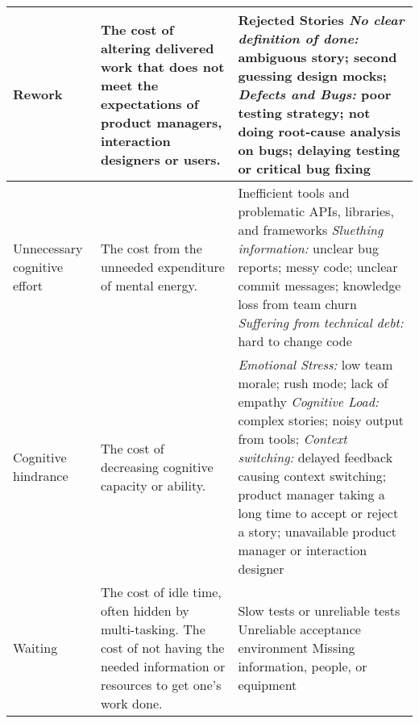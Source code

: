 \begin{table*}[t]
\begin{tabular}{|p{1.7in}|p{1.9in}|p{3in}|}
Rework                                & The cost of altering delivered work that does not meet the expectations of product managers, interaction designers or users.    & Rejected Stories \newline \textit{No clear definition of done:} ambiguous story; second guessing design mocks; \newline \textit{Defects and Bugs:} poor testing strategy; not doing root-cause analysis on bugs; delaying testing or critical bug fixing                                                                                                                                                                    \\ \hline
Unnecessary cognitive effort          &   The cost from the unneeded expenditure of mental energy.                                                                                                                 & Inefficient tools and problematic APIs, libraries, and frameworks  \newline \textit{Sluething information:} unclear bug reports; messy code; unclear commit messages; knowledge loss from team churn \newline\textit{Suffering from technical debt:} hard to change code
                                                                     \\ \hline
Cognitive hindrance           & The cost of decreasing cognitive capacity or ability.                        & \textit{Emotional Stress:} low team morale; rush mode; lack of empathy \newline \textit{Cognitive Load:} complex stories; noisy output from tools; \newline \textit{Context switching:} delayed feedback causing context switching; product manager taking a long time to accept or reject a story; unavailable product manager or interaction designer                                                                                                                                                        \\ \hline
Waiting                               & The cost of idle time, often hidden by multi-tasking. The cost of not having the needed information or resources to get one's work done. & Slow tests or unreliable tests \newline Unreliable acceptance environment \newline Missing information, people, or equipment                                                                                                                                                                                                                                                                            \\ \hline

\end{tabular}
\end{table*}

